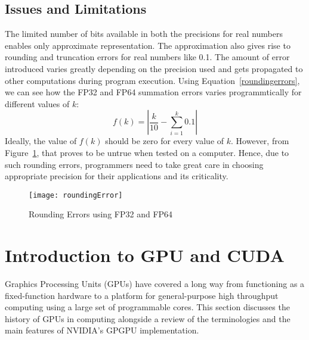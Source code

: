 \documentclass[thesis.tex]{subfiles}
\begin{document}
\subsection{Issues and Limitations}
The limited number of bits available in both the precisions for real numbers enables only approximate representation. The approximation also gives rise to rounding and truncation errors for real numbers like 0.1. The amount of error introduced varies greatly depending on the precision used and gets propagated to other computations during program execution. Using Equation~\ref{roundingerrors}, we can see how the FP32 and FP64 summation errors varies programmtically for different values of $k$:
\begin{equation}\label{roundingerrors}
f(k)=\left | \frac{k}{10} - \sum_{i=1}^{k}0.1\right |
\end{equation}
Ideally, the value of $f(k)$ should be zero for every value of $k$. However, from Figure~\ref{fig:roundingError}, that proves to be untrue when tested on a computer. Hence, due to such rounding errors, programmers need to take great care in choosing appropriate precision for their applications and its criticality. 
\begin{figure}[H]
	\centering
	\texttt{[image: roundingError]}
	\caption{Rounding Errors using FP32 and FP64}
	\label{fig:roundingError}
\end{figure}


\section{Introduction to GPU and CUDA}\label{sec:introcuda}
Graphics Processing Units (GPUs) have covered a long way from functioning as a 
fixed-function hardware to a platform  for general-purpose high throughput computing using a large set of programmable cores. This section discusses the history of GPUs in computing alongside a review of the terminologies and the main features of NVIDIA’s GPGPU implementation. 
\end{document}
